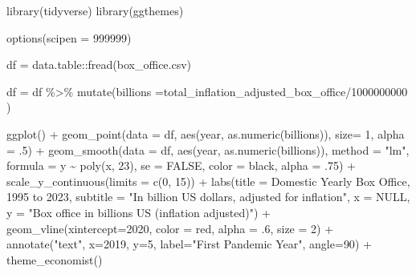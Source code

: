 \documentclass[
  letterpaper,
  DIV=11,
  numbers=noendperiod]{scrreprt}
\newenvironment{Shaded}{\begin{snugshade}}{\end{snugshade}}
\newcommand{\AttributeTok}[1]{\textcolor[rgb]{0.40,0.45,0.13}{#1}}
\newcommand{\ConstantTok}[1]{\textcolor[rgb]{0.56,0.35,0.01}{#1}}
\newcommand{\DecValTok}[1]{\textcolor[rgb]{0.68,0.00,0.00}{#1}}
\newcommand{\FunctionTok}[1]{\textcolor[rgb]{0.28,0.35,0.67}{#1}}
\newcommand{\NormalTok}[1]{\textcolor[rgb]{0.00,0.23,0.31}{#1}}
\newcommand{\OtherTok}[1]{\textcolor[rgb]{0.00,0.23,0.31}{#1}}
\newcommand{\SpecialCharTok}[1]{\textcolor[rgb]{0.37,0.37,0.37}{#1}}
\newcommand{\StringTok}[1]{\textcolor[rgb]{0.13,0.47,0.30}{#1}}
\begin{document}
\begin{Shaded}
\begin{Highlighting}[]
\FunctionTok{library}\NormalTok{(tidyverse)}
\FunctionTok{library}\NormalTok{(ggthemes)}

\FunctionTok{options}\NormalTok{(}\AttributeTok{scipen =} \DecValTok{999999}\NormalTok{)}

\NormalTok{df }\OtherTok{=}\NormalTok{ data.table}\SpecialCharTok{::}\FunctionTok{fread}\NormalTok{(}\StringTok{\textquotesingle{}box\_office.csv\textquotesingle{}}\NormalTok{)}

\NormalTok{df }\OtherTok{=}\NormalTok{ df }\SpecialCharTok{\%\textgreater{}\%} 
  \FunctionTok{mutate}\NormalTok{(}\AttributeTok{billions =}\NormalTok{total\_inflation\_adjusted\_box\_office}\SpecialCharTok{/}\DecValTok{1000000000}\NormalTok{ )}

\FunctionTok{ggplot}\NormalTok{() }\SpecialCharTok{+} 
  \FunctionTok{geom\_point}\NormalTok{(}\AttributeTok{data =}\NormalTok{ df, }\FunctionTok{aes}\NormalTok{(year, }\FunctionTok{as.numeric}\NormalTok{(billions)), }\AttributeTok{size=} \DecValTok{1}\NormalTok{, }\AttributeTok{alpha =}\NormalTok{ .}\DecValTok{5}\NormalTok{) }\SpecialCharTok{+}
  \FunctionTok{geom\_smooth}\NormalTok{(}\AttributeTok{data =}\NormalTok{ df, }\FunctionTok{aes}\NormalTok{(year, }\FunctionTok{as.numeric}\NormalTok{(billions)), }\AttributeTok{method =} \StringTok{"lm"}\NormalTok{,}
              \AttributeTok{formula =}\NormalTok{ y }\SpecialCharTok{\textasciitilde{}} \FunctionTok{poly}\NormalTok{(x, }\DecValTok{23}\NormalTok{), }\AttributeTok{se =} \ConstantTok{FALSE}\NormalTok{, }\AttributeTok{color =} \StringTok{\textquotesingle{}black\textquotesingle{}}\NormalTok{, }\AttributeTok{alpha =}\NormalTok{ .}\DecValTok{75}\NormalTok{) }\SpecialCharTok{+} 
  \FunctionTok{scale\_y\_continuous}\NormalTok{(}\AttributeTok{limits =} \FunctionTok{c}\NormalTok{(}\DecValTok{0}\NormalTok{, }\DecValTok{15}\NormalTok{)) }\SpecialCharTok{+} 
  \FunctionTok{labs}\NormalTok{(}\AttributeTok{title =} \StringTok{\textquotesingle{}Domestic Yearly Box Office, 1995 to 2023\textquotesingle{}}\NormalTok{, }
       \AttributeTok{subtitle =} \StringTok{"In billion US dollars, adjusted for inflation"}\NormalTok{, }
       \AttributeTok{x =} \ConstantTok{NULL}\NormalTok{, }
       \AttributeTok{y =} \StringTok{"Box office in billions US (inflation adjusted)"}\NormalTok{)  }\SpecialCharTok{+}
  \FunctionTok{geom\_vline}\NormalTok{(}\AttributeTok{xintercept=}\DecValTok{2020}\NormalTok{, }\AttributeTok{color =} \StringTok{\textquotesingle{}red\textquotesingle{}}\NormalTok{, }\AttributeTok{alpha =}\NormalTok{ .}\DecValTok{6}\NormalTok{, }\AttributeTok{size =} \DecValTok{2}\NormalTok{) }\SpecialCharTok{+}
  \FunctionTok{annotate}\NormalTok{(}\StringTok{"text"}\NormalTok{, }\AttributeTok{x=}\DecValTok{2019}\NormalTok{, }\AttributeTok{y=}\DecValTok{5}\NormalTok{, }\AttributeTok{label=}\StringTok{"First Pandemic Year"}\NormalTok{, }\AttributeTok{angle=}\DecValTok{90}\NormalTok{) }\SpecialCharTok{+} 
  \FunctionTok{theme\_economist}\NormalTok{()}
\end{Highlighting}
\end{Shaded}
\end{document}
